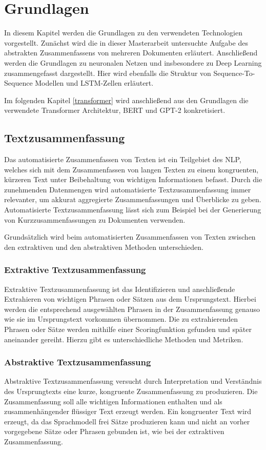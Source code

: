 \section{Grundlagen}\raggedbottom
\label{grundlagen}
In diesem Kapitel werden die Grundlagen zu den verwendeten Technologien vorgestellt. 
Zunächst wird die in dieser Masterarbeit untersuchte Aufgabe des abstrakten Zusammenfassens von mehreren Dokumenten erläutert.
Anschließend werden die Grundlagen zu neuronalen Netzen und insbesondere zu Deep Learning zusammengefasst dargestellt. 
Hier wird ebenfalls die Struktur von Sequence-To-Sequence Modellen und LSTM-Zellen erläutert.

Im folgenden Kapitel \ref*{transformer} wird anschließend aus den Grundlagen die verwendete Transformer Architektur, BERT und GPT-2 konkretisiert.


\subsection{Textzusammenfassung}
Das automatisierte Zusammenfassen von Texten ist ein Teilgebiet des NLP, welches sich mit dem Zusammenfassen von langen Texten zu einem kongruenten, kürzeren Text unter Beibehaltung von wichtigen Informationen befasst. 
Durch die zunehmenden Datenmengen wird automatisierte Textzusammenfassung immer relevanter, um akkurat aggregierte Zusammenfassungen und Überblicke zu geben.
Automatisierte Textzusammenfassung lässt sich zum Beispiel bei der Generierung von Kurzzusammenfassungen zu Dokumenten verwenden.

Grundsätzlich wird beim automatisierten Zusammenfassen von Texten zwischen den extraktiven und den abstraktiven Methoden unterschieden.

\subsubsection{Extraktive Textzusammenfassung}
Extraktive Textzusammenfassung ist das Identifizieren und anschließende Extrahieren von wichtigen Phrasen oder Sätzen aus dem Ursprungstext.
Hierbei werden die entsprechend ausgewählten Phrasen in der Zusammenfassung genauso wie sie im Ursprungstext vorkommen übernommen.
Die zu extrahierenden Phrasen oder Sätze werden mithilfe einer Scoringfunktion gefunden und später aneinander gereiht. Hierzu gibt es unterschiedliche Methoden und Metriken.

\subsubsection{Abstraktive Textzusammenfassung}
Abstraktive Textzusammenfassung versucht durch Interpretation und Verständnis des Ursprungtexts eine kurze, kongruente Zusammenfassung zu produzieren. 
Die Zusammenfassung soll alle wichtigen Informationen enthalten und als zusammenhängender flüssiger Text erzeugt werden. Ein kongruenter Text wird erzeugt, da das Sprachmodell frei Sätze produzieren kann und nicht an vorher vorgegebene Sätze oder Phrasen gebunden ist, wie bei der extraktiven Zusammenfassung.

